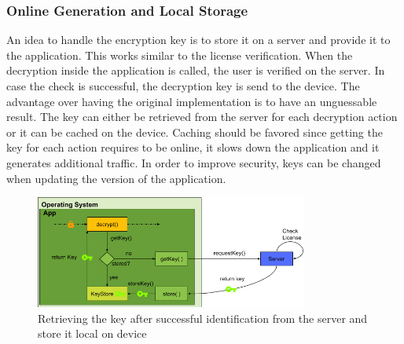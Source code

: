 \subsubsection{Online Generation and Local Storage} \label{section:counter-replace-encryption-key-online}
An idea to handle the encryption key is to store it on a server and provide it to the application.
This works similar to the license verification.
When the decryption inside the application is called, the user is verified on the server.
In case the check is successful, the decryption key is send to the device.
The advantage over having the original implementation is to have an unguessable result.
The key can either be retrieved from the server for each decryption action or it can be cached on the device.
Caching should be favored since getting the key for each action requires to be online, it slows down the application and it generates additional traffic.
In order to improve security, keys can be changed when updating the version of the application.
\begin{figure}[h]
    \centering
    \includegraphics[width=0.8\textwidth]{data/encryptionKeyServer.png}
    \caption{Retrieving the key after successful identification from the server and store it local on device}
    \label{fig:encryptionKeyServer}
\end{figure}
